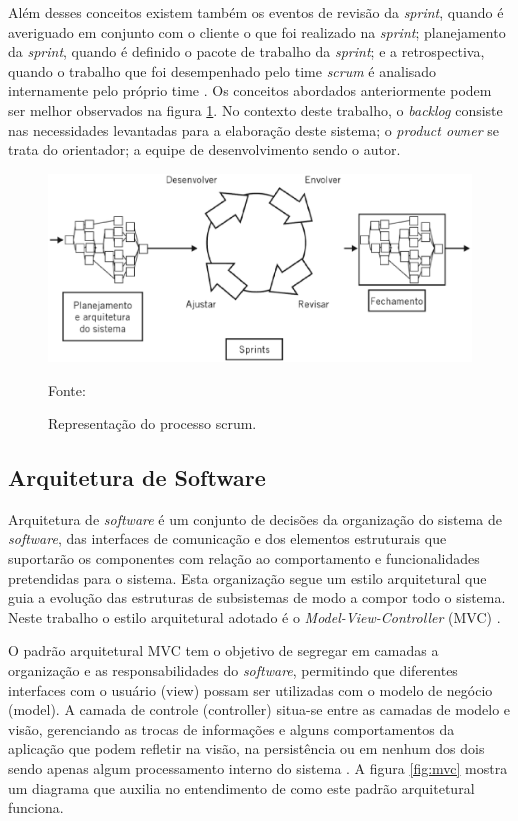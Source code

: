 Além desses conceitos existem também os eventos de revisão da \textit{sprint}, quando é averiguado em conjunto com o cliente o que foi realizado na \textit{sprint}; planejamento da \textit{sprint}, quando é definido o pacote de trabalho da \textit{sprint}; e a retrospectiva, quando o trabalho que foi desempenhado pelo time \textit{scrum} é analisado internamente pelo próprio time \cite{prik2014}. Os conceitos abordados anteriormente podem ser melhor observados na figura \ref{fig:scrum}. No contexto deste trabalho, o \textit{backlog} consiste nas necessidades levantadas para a elaboração deste sistema; o \textit{product owner} se trata do orientador; a equipe de desenvolvimento sendo o autor.

\begin{figure}[h!]
	\centering
  	\includegraphics[width=.9\linewidth]{figuras/scrum.eps}
  	\caption{Representação do processo scrum.}
  	\small{Fonte: \cite{scrum2014}}
  	\label{fig:scrum}
\end{figure}

\subsection{Arquitetura de Software}

Arquitetura de \textit{software} é um conjunto de decisões da organização do sistema de \textit{software}, das interfaces de comunicação e dos elementos estruturais que suportarão os componentes com relação ao comportamento e funcionalidades pretendidas para o sistema. Esta organização segue um estilo arquitetural que guia a evolução das estruturas de subsistemas de modo a compor todo o sistema. Neste trabalho o estilo arquitetural adotado é o \textit{Model-View-Controller} (MVC) \cite{clements2010}.

O padrão arquitetural MVC tem o objetivo de segregar em camadas a organização e as responsabilidades do \textit{software}, permitindo que diferentes interfaces com o usuário (view) possam ser utilizadas com o modelo de negócio (model). A camada de controle (controller) situa-se entre as camadas de modelo e visão, gerenciando as trocas de informações e alguns comportamentos da aplicação que podem refletir na visão, na persistência ou em nenhum dos dois sendo apenas algum processamento interno do sistema  \cite{krasner1988}. A figura \ref{fig:mvc} mostra um diagrama que auxilia no entendimento de como este padrão arquitetural funciona.

